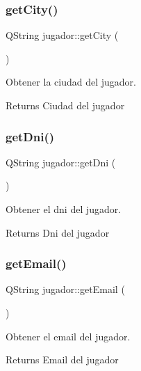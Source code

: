 \subsubsection{\texorpdfstring{get\+City()}{getCity()}}
{\footnotesize\ttfamily Q\+String jugador\+::get\+City (\begin{DoxyParamCaption}{ }\end{DoxyParamCaption})}



Obtener la ciudad del jugador. 

\begin{DoxyReturn}{Returns}
Ciudad del jugador 
\end{DoxyReturn}
\mbox{\label{classjugador_ac9609bf100bfb43e2e9582a8e69abdb5}} 
\subsubsection{\texorpdfstring{get\+Dni()}{getDni()}}
{\footnotesize\ttfamily Q\+String jugador\+::get\+Dni (\begin{DoxyParamCaption}{ }\end{DoxyParamCaption})}



Obtener el dni del jugador. 

\begin{DoxyReturn}{Returns}
Dni del jugador 
\end{DoxyReturn}
\mbox{\label{classjugador_a65a647a2c1beedbb2dc2e4b6847bff69}} 
\subsubsection{\texorpdfstring{get\+Email()}{getEmail()}}
{\footnotesize\ttfamily Q\+String jugador\+::get\+Email (\begin{DoxyParamCaption}{ }\end{DoxyParamCaption})}



Obtener el email del jugador. 

\begin{DoxyReturn}{Returns}
Email del jugador 
\end{DoxyReturn}
\mbox{\label{classjugador_a0538f173119697d49b6bfc95c9558580}} 
